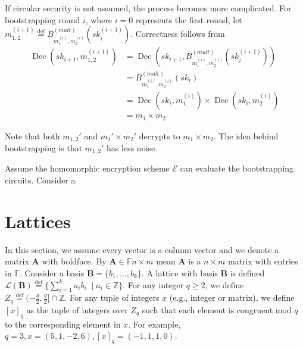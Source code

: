 If circular security is not assumed, the process becomes more complicated. For bootstrapping round $i$, where $i = 0$ represents the first round, let $m_{1,2}^{(i+1)} \stackrel{\mathrm{def}}{=} B_{m_1^{(i)},m_2^{(i)}}^{(mult)}(sk_i^{(i+1)})$. Correctness follows from
\begin{equation*}
    \begin{aligned}
        \operatorname{Dec}(sk_{i+1}, m_{1,2}^{(i+1)}) &= \operatorname{Dec}(sk_{i+1}, B_{m_1^{(i)},m_2^{(i)}}^{(mult)}(sk_i^{(i+1)})) \\
        &= B_{m_1^{(i)},m_2^{(i)}}^{(mult)}(sk_i)\\
        &= \operatorname{Dec}(sk_i, m_1^{(i)}) \times \operatorname{Dec}(sk_i, m_2^{(i)})\\
        &= m_1 \times m_2
    \end{aligned}
\end{equation*}

Note that both $m_{1,2}'$ and $m_1' \times m_2'$ decrypts to $m_1 \times m_2$. The idea behind bootstrapping is that $m_{1,2}'$ has less noise.


Assume the homomorphic encryption scheme $\mathcal{E}$ can evaluate the bootstrapping circuits. Consider a 


\section{Lattices}

In this section, we assume every vector is a column vector and we denote a matrix $\textbf{A}$ with boldface. By $\textbf{A} \in \mathbb{F}{n \times m}$ mean $\textbf{A}$ is a $n \times m$ matrix with entries in $\mathbb{F}$. Consider a basis $\textbf{B} = \{b_1, \dots, b_k\}$. A lattice with basis $\textbf{B}$ is defined $\mathcal{L}(\textbf{B}) \stackrel{\mathrm{def}}{=} \{ \sum_{i=1}^k a_i b_i \; \mid a_i \in \mathbb{Z}\}$. For any integer $q \geq 2$, we define $Z_q \stackrel{\mathrm{def}}{=} (-\frac{q}{2}, \frac{q}{2}] \cap \mathbb{Z}$. For any tuple of integers $x$ (e.g., integer or matrix), we define $[x]_q$ as the tuple of integers over $Z_q$ such that each element is congruent mod $q$ to the corresponding element in $x$. For example, $q = 3, x = (5,1,-2,6), [x]_q = (-1,1,1,0)$.

